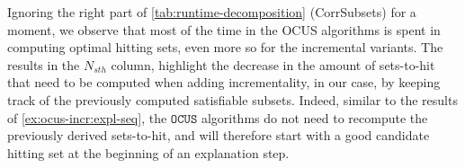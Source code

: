 \documentclass[a4paper,UKenglish,cleveref, autoref, thm-restate, pdfa]{lipics-v2021}
\newcommand\mm[1]{\ensuremath{#1}\xspace}
\newcommand\call[1]{\mm{\texttt{#1}}}
\newcommand\comus{\mm{\call{OCUS}}}
\begin{document}
		Ignoring the right part of \cref{tab:runtime-decomposition} (CorrSubsets) for a moment, we observe that most of the time in the OCUS algorithms is spent in computing optimal hitting sets, even more so for the incremental variants.
		The results in the $N_{sth}$ column, highlight the decrease in the amount of sets-to-hit that need to be computed when adding incrementality, in our case, by keeping track of the previously computed satisfiable subsets. 
		Indeed, similar to the results of \cref{ex:ocus-incr:expl-seq}, the \comus algorithms do not need to recompute the previously derived sets-to-hit, and will therefore start with a good candidate hitting set at the beginning of an explanation step.
		
\end{document}
